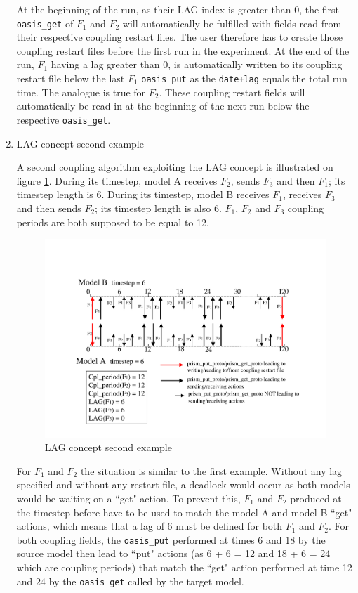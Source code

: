 \begin{enumerate}
  At the beginning of the run, as their LAG index is greater than 0,
  the first {\tt oasis\_get} of $F_1$ and $F_2$ will automatically be
  fulfilled with fields read from their respective coupling restart
  files. The user therefore has to create those coupling restart files
  before the first run in the experiment. At the end of the run, $F_1$
  having a lag greater than 0, is automatically written to its
  coupling restart file below the last $F_1$ {\tt oasis\_put} as the
  {\tt date+lag} equals the total run time. The analogue is true for
  $F_2$. These coupling restart fields will automatically be read in at the beginning
  of the next run below the respective {\tt oasis\_get}.

\item LAG concept second example

  A second coupling algorithm exploiting the LAG concept is
  illustrated on figure \ref{fig:lag_concept_2}. During its timestep,
  model A receives $F_2$, sends $F_3$ and then $F_1$; its timestep
  length is 6. During its timestep, model B receives $F_1$, receives
  $F_3$ and then sends $F_2$; its timestep length is also 6.  $F_1$,
  $F_2$ and $F_3$ coupling periods are both supposed to be equal to
  12.
 
  \begin{figure}
    \includegraphics[scale=.6]{figures/fig_lag_concept_2}
    \caption{LAG concept second example}
    \label{fig:lag_concept_2}
  \end{figure}

  For $F_1$ and $F_2$ the situation is similar to the first
  example. Without any lag specified and without any restart file, a deadlock
  would occur as both models would be waiting on a ``get" action. To
  prevent this, $F_1$ and $F_2$ produced at the timestep before have
  to be used to match the model A and model B ``get" actions, which
  means that a lag of 6 must be defined for both $F_1$ and $F_2$. For
  both coupling fields, the {\tt oasis\_put} performed at times 6 and
  18 by the source model then lead to ``put" actions (as 6 + 6 = 12
  and 18 + 6 = 24 which are coupling periods) that match the ``get"
  action performed at time 12 and 24 by the {\tt oasis\_get} called
  by the target model.


\end{enumerate}
